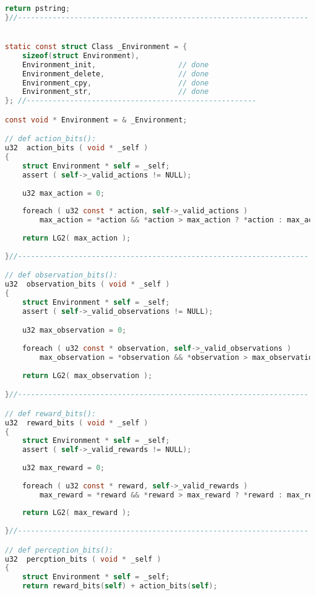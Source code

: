 \documentclass[fancychapters]{report}   	%
\begin{document}
\begin{lstlisting}[language=C,caption={environment.c}]
    return pstring;
}//-------------------------------------------------------------------


static const struct Class _Environment = {
    sizeof(struct Environment),
    Environment_init,                   // done
    Environment_delete,                 // done
    Environment_cpy,                    // done
    Environment_str,                    // done
}; //-----------------------------------------------------

const void * Environment = & _Environment;

// def action_bits():
u32  action_bits ( void * _self )
{
    struct Environment * self = _self;
    assert ( self->_valid_actions != NULL);
    
    u32 max_action = 0;
    
    foreach ( u32 const * action, self->_valid_actions )
        max_action = *action && *action > max_action ? *action : max_action;
    
    return LG2( max_action );
    
}//-------------------------------------------------------------------

// def observation_bits():
u32  observation_bits ( void * _self )
{
    struct Environment * self = _self;
    assert ( self->_valid_observations != NULL);

    u32 max_observation = 0;
    
    foreach ( u32 const * observation, self->_valid_observations )
        max_observation = *observation && *observation > max_observation ? *observation : max_observation;
    
    return LG2( max_observation );

}//-------------------------------------------------------------------

// def reward_bits():
u32  reward_bits ( void * _self )
{
    struct Environment * self = _self;
    assert ( self->_valid_rewards != NULL);
    
    u32 max_reward = 0;
    
    foreach ( u32 const * reward, self->_valid_rewards )
        max_reward = *reward && *reward > max_reward ? *reward : max_reward;
    
    return LG2( max_reward );
    
}//-------------------------------------------------------------------

// def perception_bits():
u32  percption_bits ( void * _self )
{
    struct Environment * self = _self;
    return reward_bits(self) + action_bits(self);
    

\end{lstlisting}
\end{document}
